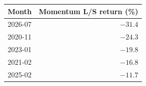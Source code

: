 \begin{tabular}{lr}
\toprule
Month & Momentum L/S return (\%) \\
\midrule
2026-07 & $-31.4$ \\
2020-11 & $-24.3$ \\
2023-01 & $-19.8$ \\
2021-02 & $-16.8$ \\
2025-02 & $-11.7$ \\
\bottomrule
\end{tabular}
